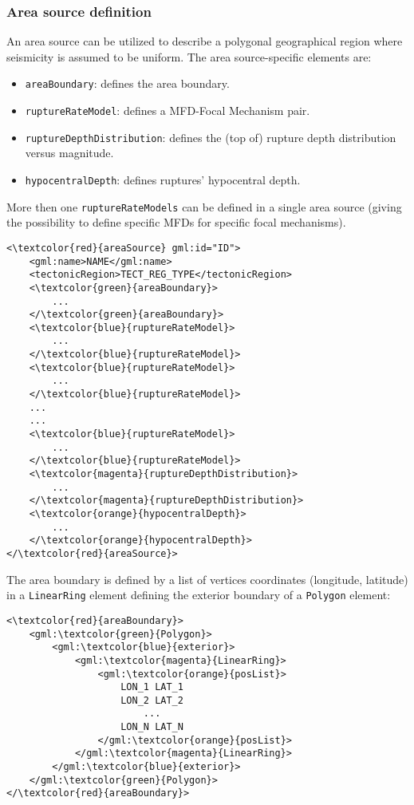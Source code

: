 \subsubsection{Area source definition}
An area source can be utilized to describe a polygonal geographical region where seismicity is assumed to be uniform. The area source-specific elements are:
\begin{itemize}
\item \Verb+areaBoundary+: defines the area boundary.
\item \Verb+ruptureRateModel+: defines a MFD-Focal Mechanism pair.
\item \Verb+ruptureDepthDistribution+: defines the (top of) rupture depth distribution versus magnitude.
\item \Verb+hypocentralDepth+: defines ruptures' hypocentral depth.
\end{itemize}
More then one \Verb+ruptureRateModels+ can be defined in a single area source (giving the possibility to define specific MFDs for specific focal mechanisms).
\begin{Verbatim}[frame=single, commandchars=\\\{\},fontsize=\normalsize, samepage=true]
<\textcolor{red}{areaSource} gml:id="ID">
	<gml:name>NAME</gml:name>
	<tectonicRegion>TECT_REG_TYPE</tectonicRegion>
	<\textcolor{green}{areaBoundary}>
		...
	</\textcolor{green}{areaBoundary}>
	<\textcolor{blue}{ruptureRateModel}>
		...
	</\textcolor{blue}{ruptureRateModel}>
	<\textcolor{blue}{ruptureRateModel}>
		...
	</\textcolor{blue}{ruptureRateModel}>
	...
	...
	<\textcolor{blue}{ruptureRateModel}>
		...
	</\textcolor{blue}{ruptureRateModel}>
	<\textcolor{magenta}{ruptureDepthDistribution}>
		...
	</\textcolor{magenta}{ruptureDepthDistribution}>
	<\textcolor{orange}{hypocentralDepth}>
		...	
	</\textcolor{orange}{hypocentralDepth}>
</\textcolor{red}{areaSource}>
\end{Verbatim}
The area boundary is defined by a list of vertices coordinates (longitude, latitude) in a \Verb+LinearRing+ element defining the exterior boundary of a \Verb+Polygon+ element:
\begin{Verbatim}[frame=single, commandchars=\\\{\},fontsize=\normalsize, samepage=true]
<\textcolor{red}{areaBoundary}>
	<gml:\textcolor{green}{Polygon}>
		<gml:\textcolor{blue}{exterior}>
			<gml:\textcolor{magenta}{LinearRing}>
				<gml:\textcolor{orange}{posList}>
					LON_1 LAT_1
					LON_2 LAT_2
						...			
					LON_N LAT_N
				</gml:\textcolor{orange}{posList}>
			</gml:\textcolor{magenta}{LinearRing}>
		</gml:\textcolor{blue}{exterior}>
	</gml:\textcolor{green}{Polygon}>
</\textcolor{red}{areaBoundary}>
\end{Verbatim}
